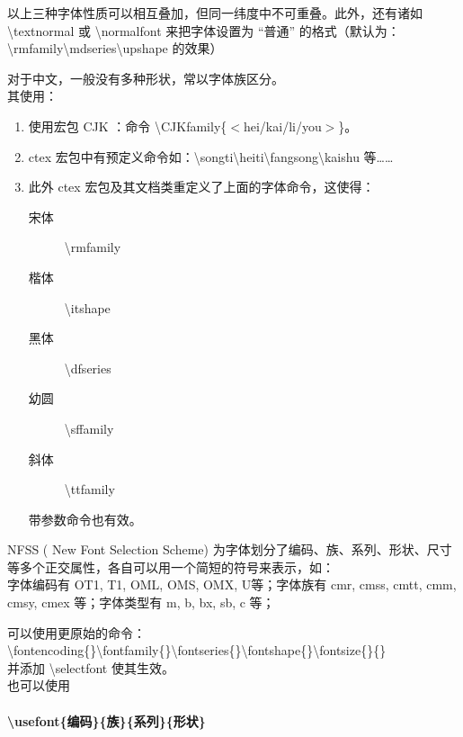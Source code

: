 \documentclass[UTF8]{ctexart}
\begin{document}
            以上三种字体性质可以相互叠加，但同一纬度中不可重叠。此外，还有诸如 \textbackslash textnormal 或 \textbackslash normalfont 来把字体设置为 “普通” 的格式（默认为：\textbackslash rmfamily\textbackslash mdseries\textbackslash upshape 的效果）

            对于中文，一般没有多种形状，常以字体族区分。\\其使用：

            \begin{enumerate}
                \item 使用宏包 CJK ：命令 \textbackslash CJKfamily\{$<$hei/kai/li/you$>$\}。
                \item ctex 宏包中有预定义命令如：\textbackslash songti\quad \textbackslash heiti\quad \textbackslash fangsong\quad \textbackslash kaishu 等……
                \item 此外 ctex 宏包及其文档类重定义了上面的字体命令，这使得：
                \begin{description}
                    \item[宋体] \textbackslash rmfamily
                    \item[楷体] \textbackslash itshape
                    \item[黑体] \textbackslash dfseries
                    \item[幼圆] \textbackslash sffamily
                    \item[斜体] \textbackslash ttfamily  
                \end{description}
                带参数命令也有效。
            \end{enumerate}

            NFSS ( New Font Selection Scheme) 为字体划分了编码、族、系列、形状、尺寸等多个正交属性，各自可以用一个简短的符号来表示，如：\\
            字体编码有 OT1, T1, OML, OMS, OMX, U等；字体族有 cmr, cmss, cmtt, cmm, cmsy, cmex 等；字体类型有 m, b, bx, sb, c 等；
            
            可以使用更原始的命令：\\
            \textbackslash fontencoding\{\}\quad \textbackslash fontfamily\{\}\quad \textbackslash fontseries\{\}\quad \textbackslash fontshape\{\}\quad \textbackslash fontsize\{\}\{\}\quad \\
            并添加 \textbackslash selectfont 使其生效。\\
            也可以使用 \paragraph{\textbackslash usefont\{编码\}\{族\}\{系列\}\{形状\}}
\end{document}
